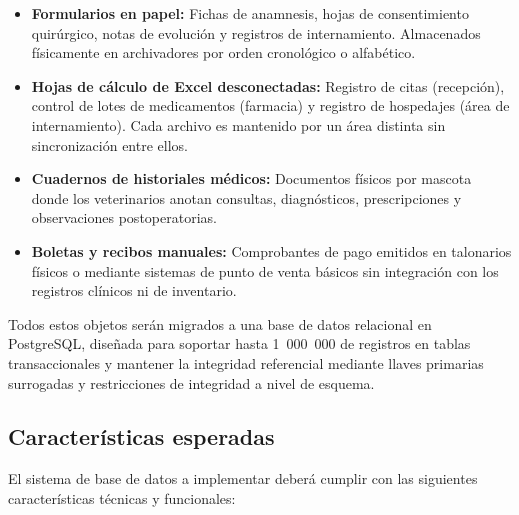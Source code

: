 \begin{itemize}
	\item \textbf{Formularios en papel:} Fichas de anamnesis, hojas de consentimiento quirúrgico, notas de evolución y registros de internamiento. Almacenados físicamente en archivadores por orden cronológico o alfabético.
	\item \textbf{Hojas de cálculo de Excel desconectadas:} Registro de citas (recepción), control de lotes de medicamentos (farmacia) y registro de hospedajes (área de internamiento). Cada archivo es mantenido por un área distinta sin sincronización entre ellos.
	\item \textbf{Cuadernos de historiales médicos:} Documentos físicos por mascota donde los veterinarios anotan consultas, diagnósticos, prescripciones y observaciones postoperatorias.
	\item \textbf{Boletas y recibos manuales:} Comprobantes de pago emitidos en talonarios físicos o mediante sistemas de punto de venta básicos sin integración con los registros clínicos ni de inventario.
\end{itemize}

Todos estos objetos serán migrados a una base de datos relacional en PostgreSQL, diseñada para soportar hasta 1~000~000 de registros en tablas transaccionales y mantener la integridad referencial mediante llaves primarias surrogadas y restricciones de integridad a nivel de esquema.

\subsection{Características esperadas}

El sistema de base de datos a implementar deberá cumplir con las siguientes características técnicas y funcionales:

